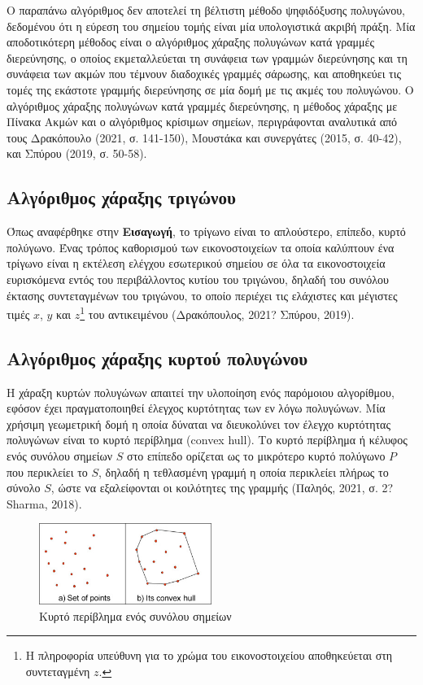 Ο παραπάνω αλγόριθμος δεν αποτελεί τη βέλτιστη μέθοδο ψηφιδόξυσης πολυγώνου, δεδομένου ότι η εύρεση του σημείου τομής είναι μία υπολογιστικά ακριβή πράξη. Μία αποδοτικότερη μέθοδος είναι ο αλγόριθμος χάραξης πολυγώνων κατά γραμμές διερεύνησης, ο οποίος εκμεταλλεύεται τη συνάφεια των γραμμών διερεύνησης και τη συνάφεια των ακμών που τέμνουν διαδοχικές γραμμές σάρωσης, και αποθηκεύει τις τομές της εκάστοτε γραμμής διερεύνησης σε μία δομή με τις ακμές του πολυγώνου. Ο αλγόριθμος χάραξης πολυγώνων κατά γραμμές διερεύνησης, η μέθοδος χάραξης με Πίνακα Ακμών και ο αλγόριθμος κρίσιμων σημείων, περιγράφονται αναλυτικά από τους Δρακόπουλο (2021, σ. 141-150), Μουστάκα και συνεργάτες (2015, σ. 40-42), και Σπύρου (2019, σ. 50-58).

\subsection{Αλγόριθμος χάραξης τριγώνου}
Όπως αναφέρθηκε στην \textbf{Εισαγωγή}, το τρίγωνο είναι το απλούστερο, επίπεδο, κυρτό πολύγωνο. Ένας τρόπος καθορισμού των εικονοστοιχείων τα οποία καλύπτουν ένα τρίγωνο είναι η εκτέλεση ελέγχου εσωτερικού σημείου σε όλα τα εικονοστοιχεία ευρισκόμενα εντός του περιβάλλοντος κυτίου του τριγώνου, δηλαδή του συνόλου έκτασης συντεταγμένων του τριγώνου, το οποίο περιέχει τις ελάχιστες και μέγιστες τιμές $x$, $y$ και $z$\footnote{Η πληροφορία υπεύθυνη για το χρώμα του εικονοστοιχείου αποθηκεύεται στη συντεταγμένη $z$.} του αντικειμένου (Δρακόπουλος, 2021? Σπύρου, 2019).

\subsection{Αλγόριθμος χάραξης κυρτού πολυγώνου}
Η χάραξη κυρτών πολυγώνων απαιτεί την υλοποίηση ενός παρόμοιου αλγορίθμου, εφόσον έχει πραγματοποιηθεί έλεγχος κυρτότητας των εν λόγω πολυγώνων. Μία χρήσιμη γεωμετρική δομή η οποία δύναται να διευκολύνει τον έλεγχο κυρτότητας πολυγώνων είναι το κυρτό περίβλημα (\textlatin{convex hull}). Το κυρτό περίβλημα ή κέλυφος ενός συνόλου σημείων $S$ στο επίπεδο ορίζεται ως το μικρότερο κυρτό πολύγωνο $Ρ$ που περικλείει το $S$, δηλαδή η τεθλασμένη γραμμή η οποία περικλείει πλήρως το σύνολο $S$, ώστε να εξαλείφονται οι κοιλότητες της γραμμής (Παληός, 2021, σ. 2? \textlatin{Sharma}, 2018). \par

\begin{figure}[h]
\centering
\includegraphics[width=0.5\textwidth]{images/convexhull}
\caption{Κυρτό περίβλημα ενός συνόλου σημείων}
\end{figure}

